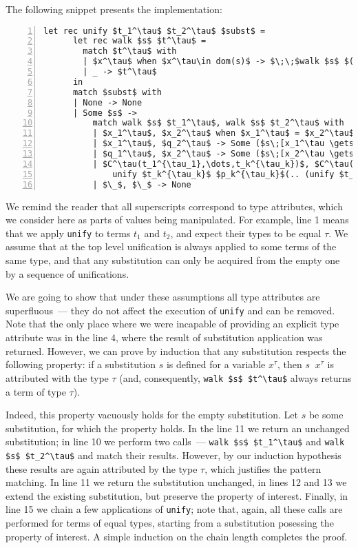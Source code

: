 The following snippet presents the implementation:

\begin{lstlisting}[mathescape=true,numbers=left,numberstyle=\small,stepnumber=1,numbersep=-5pt]
    let rec unify $t_1^\tau$ $t_2^\tau$ $subst$ =
      let rec walk $s$ $t^\tau$ =
        match $t^\tau$ with
        | $x^\tau$ when $x^\tau\in dom(s)$ -> $\;\;$walk $s$ $(s\;\;x^\tau)$
        | _ -> $t^\tau$
      in
      match $subst$ with
      | None -> None
      | Some $s$ ->
          match walk $s$ $t_1^\tau$, walk $s$ $t_2^\tau$ with
          | $x_1^\tau$, $x_2^\tau$ when $x_1^\tau$ = $x_2^\tau$ -> $subst$
          | $x_1^\tau$, $q_2^\tau$ -> Some ($s\;[x_1^\tau \gets q_2^\tau]$)
          | $q_1^\tau$, $x_2^\tau$ -> Some ($s\;[x_2^\tau \gets q_1^\tau]$)
          | $C^\tau(t_1^{\tau_1},\dots,t_k^{\tau_k})$, $C^\tau(p_1^{\tau_1},\dots,p_k^{\tau_k})$ ->
              unify $t_k^{\tau_k}$ $p_k^{\tau_k}$(.. (unify $t_1^{\tau_1}$ $p_1^{\tau_1}$ $subst$)$..$)
          | $\_$, $\_$ -> None
\end{lstlisting}

We remind the reader that all superscripts correspond to type attributes, which we consider here as
parts of values being manipulated. For example, line 1 means that we apply \lstinline{unify}
to terms $t_1$ and $t_2$, and expect their types to be equal $\tau$. We assume that
at the top level unification is always applied to some terms of the same type, and that any
substitution can only be acquired from the empty one by a sequence of unifications.

We are going to show that under these assumptions all type attributes are superfluous~--- they
do not affect the execution of \lstinline{unify} and can be removed. Note that the only place where we
were incapable of providing an explicit type attribute was in the line 4, where the result of
substitution application was returned. However, we can prove by induction that any substitution
respects the following property: if a substitution $s$ is defined for a variable $x^\tau$,
then $s\;\;x^\tau$ is attributed with the type $\tau$ (and, consequently, \lstinline{walk $s$ $t^\tau$} always
returns a term of type $\tau$).

Indeed, this property vacuously holds for the empty substitution. Let $s$ be some substitution, for which the
property holds. In the line 11 we return an unchanged substitution; in line 10 we perform two calls~---
\lstinline{walk $s$ $t_1^\tau$} and \lstinline{walk $s$ $t_2^\tau$} and match their results. However,
by our induction hypothesis these results are again attributed by the type $\tau$, which justifies the
pattern matching. In line 11 we return the substitution unchanged, in lines 12 and 13 we extend the
existing substitution, but preserve the property of interest. Finally, in line 15 we chain a few
applications of \lstinline{unify}; note that, again, all these calls are performed for terms of equal
types, starting from a substitution posessing the property of interest. A simple induction on the
chain length completes the proof.

